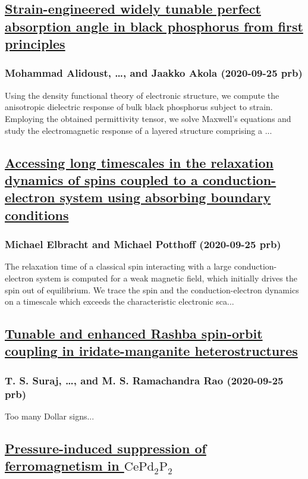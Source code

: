 \subsection*{\href{http://link.aps.org/doi/10.1103/PhysRevB.102.115307}{Strain-engineered widely tunable perfect absorption angle in black phosphorus from first principles}}
\subsubsection*{Mohammad Alidoust, \dots, and Jaakko Akola (2020-09-25 prb)}
Using the density functional theory of electronic structure, we compute the anisotropic dielectric response of bulk black phosphorus subject to strain. Employing the obtained permittivity tensor, we solve Maxwell's equations and study the electromagnetic response of a layered structure comprising a ...
\subsection*{\href{http://link.aps.org/doi/10.1103/PhysRevB.102.115434}{Accessing long timescales in the relaxation dynamics of spins coupled to a conduction-electron system using absorbing boundary conditions}}
\subsubsection*{Michael Elbracht and Michael Potthoff (2020-09-25 prb)}
The relaxation time of a classical spin interacting with a large conduction-electron system is computed for a weak magnetic field, which initially drives the spin out of equilibrium. We trace the spin and the conduction-electron dynamics on a timescale which exceeds the characteristic electronic sca...
\subsection*{\href{http://link.aps.org/doi/10.1103/PhysRevB.102.125145}{Tunable and enhanced Rashba spin-orbit coupling in iridate-manganite heterostructures}}
\subsubsection*{T. S. Suraj, \dots, and M. S. Ramachandra Rao (2020-09-25 prb)}
Too many Dollar signs...
\subsection*{\href{http://link.aps.org/doi/10.1103/PhysRevB.102.125146}{Pressure-induced suppression of ferromagnetism in ${\mathrm{CePd}}_{2}{\mathrm{P}}_{2}$}}
